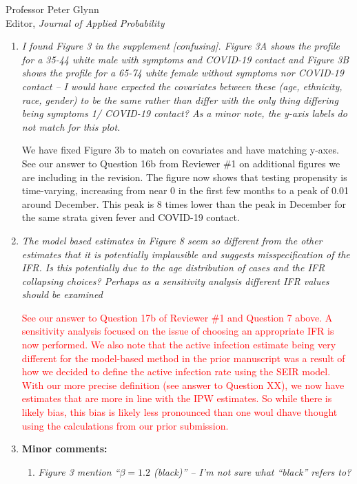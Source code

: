 \documentclass[11pt]{letter} %
\begin{document}
\begin{letter}{Professor
	Peter Glynn\\
	Editor, {\em Journal of Applied Probability}}
\begin{enumerate}
\vspace{5mm}
\item {\it I found Figure 3 in the supplement [confusing]. Figure 3A shows the profile for a 35-44 white male with symptoms and COVID-19 contact and Figure 3B shows the profile for a 65-74 white female without symptoms nor COVID-19 contact – I would have expected the covariates between these (age, ethnicity, race, gender) to be the same rather than differ with the only thing differing being symptoms 1/ COVID-19 contact? As a minor note, the y-axis labels do not match for this plot.}

\vspace{5mm}
We have fixed Figure 3b to match on covariates and have matching y-axes.  See our answer to Question 16b from Reviewer \#1 on additional figures we are including in the revision.  The figure now shows that testing propensity is time-varying, increasing from near 0 in the first few months to a peak of 0.01 around December.  This peak is 8 times lower than the peak in December for the same strata given fever and COVID-19 contact.
\vspace{5mm}
\item {\it The model based estimates in Figure 8 seem so different from the other estimates that it is potentially implausible and suggests misspecification of the IFR. Is this potentially due to the age distribution of cases and the IFR collapsing choices? Perhaps as a sensitivity analysis different IFR values should be examined}

\vspace{5mm}
\textcolor{red}{See our answer to Question 17b of Reviewer \#1 and Question 7 above. A sensitivity analysis focused on the issue of choosing an appropriate IFR is now performed.  We also note that the active infection estimate being very different for the model-based method in the prior manuscript was a result of how we decided to define the active infection rate using the SEIR model.  With our more precise definition (see answer to Question XX), we now have estimates that are more in line with the IPW estimates.  So while there is likely bias, this bias is likely less pronounced than one woul dhave thought using the calculations from our prior submission.}
\vspace{5mm}
\item {\bf Minor comments:}
	\begin{enumerate}
		\item {\it Figure 3 mention “$\beta = 1.2$ (black)” – I’m not sure what “black” refers to?}
		\vspace{5mm}


\end{enumerate}
\end{enumerate}
\end{letter}
\end{document}
